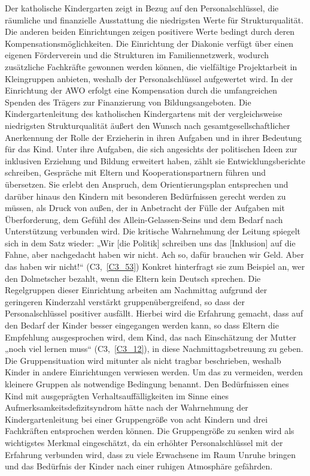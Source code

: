 Der katholische Kindergarten zeigt in Bezug auf den Personalschlüssel, die räumliche und finanzielle Ausstattung die niedrigsten Werte für Strukturqualität. Die anderen beiden Einrichtungen zeigen positivere Werte bedingt durch deren Kompensationsmöglichkeiten. Die Einrichtung der Diakonie verfügt über einen eigenen Förderverein und die Strukturen im Familiennetzwerk, wodurch zusätzliche Fachkräfte gewonnen werden können, die vielfältige Projektarbeit in Kleingruppen anbieten, weshalb der Personalschlüssel aufgewertet wird. In der Einrichtung der AWO erfolgt eine Kompensation durch die umfangreichen Spenden des Trägers zur Finanzierung von Bildungsangeboten. Die Kindergartenleitung des katholischen Kindergartens mit der vergleichsweise niedrigsten Strukturqualität äußert den Wunsch nach gesamtgesellschaftlicher Anerkennung der Rolle der Erzieherin in ihren Aufgaben und in ihrer Bedeutung für das Kind. Unter ihre Aufgaben, die sich angesichts der politischen Ideen zur inklusiven Erziehung und Bildung erweitert haben, zählt sie Entwicklungsberichte schreiben, Gespräche mit Eltern und Kooperationspartnern führen und übersetzen. Sie erlebt den Anspruch, dem Orientierungsplan entsprechen und darüber hinaus den Kindern mit besonderen Bedürfnissen gerecht werden zu müssen, als Druck von außen, der in Anbetracht der Fülle der Aufgaben mit Überforderung, dem Gefühl des Allein-Gelassen-Seins und dem Bedarf nach Unterstützung verbunden wird. Die kritische Wahrnehmung der Leitung spiegelt sich in dem Satz wieder: „Wir {[die Politik]} schreiben uns das {[Inklusion]} auf die Fahne, aber nachgedacht haben wir nicht. Ach so, dafür brauchen wir Geld. Aber das haben wir nicht!“ (C3,~\ref{C3_53}) Konkret hinterfragt sie zum Beispiel an, wer den Dolmetscher bezahlt, wenn die Eltern kein Deutsch sprechen. Die Regelgruppen dieser Einrichtung arbeiten am Nachmittag aufgrund der geringeren Kinderzahl verstärkt gruppenübergreifend, so dass der Personalschlüssel positiver ausfällt. Hierbei wird die Erfahrung gemacht, dass auf den Bedarf der Kinder besser eingegangen werden kann, so dass Eltern die Empfehlung ausgesprochen wird, dem Kind, das nach Einschätzung der Mutter „noch viel lernen muss“ (C3,~\ref{C3_12}), in diese Nachmittagsbetreuung zu geben. Die Gruppensituation wird mitunter als nicht tragbar beschrieben, weshalb Kinder in andere Einrichtungen verwiesen werden.
Um das zu vermeiden, werden kleinere Gruppen als notwendige Bedingung benannt. Den Bedürfnissen eines Kind mit ausgeprägten Verhaltsauffälligkeiten im Sinne eines Aufmerksamkeitsdefizitsyndrom hätte nach der Wahrnehmung der Kindergartenleitung bei einer Gruppengröße von acht Kindern und drei Fachkräften entsprochen werden können. 
Die Gruppengröße zu senken wird als wichtigstes Merkmal eingeschätzt, da ein erhöhter Personalschlüssel mit der Erfahrung verbunden wird, dass zu viele Erwachsene im Raum Unruhe bringen und das Bedürfnis der Kinder nach einer ruhigen Atmosphäre gefährden.


